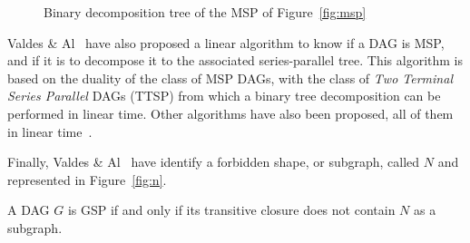 \begin{figure}[h!]
\begin{center}
  \caption{Binary decomposition tree of the MSP of Figure~\ref{fig:msp}}
  \label{fig:t}
\end{center}
\end{figure}

Valdes \& Al~\cite{Valdes:1979:RSP:800135.804393} have also proposed a linear algorithm to know if a DAG is MSP, and if it is to decompose it to the associated series-parallel tree. This algorithm is based on the duality of the class of MSP DAGs, with the class of \emph{Two Terminal Series Parallel} DAGs (TTSP) from which a binary tree decomposition can be performed in linear time. Other algorithms have also been proposed, all of them in linear time~\cite{Schoenmakers95anew}.

Finally, Valdes \& Al~\cite{Valdes:1979:RSP:800135.804393} have identify a forbidden shape, or subgraph, called $N$ and represented in Figure~\ref{fig:n}.

\begin{mydef}
A DAG $G$ is GSP if and only if its transitive closure does not contain $N$ as a subgraph.
\end{mydef}

